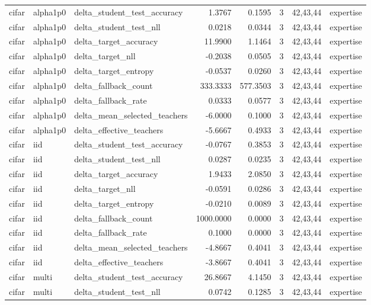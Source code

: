 \begin{tabular}{lllrrrll}
cifar & alpha1p0 & delta\_student\_test\_accuracy & 1.3767 & 0.1595 & 3 & 42,43,44 & expertise \\
cifar & alpha1p0 & delta\_student\_test\_nll & 0.0218 & 0.0344 & 3 & 42,43,44 & expertise \\
cifar & alpha1p0 & delta\_target\_accuracy & 11.9900 & 1.1464 & 3 & 42,43,44 & expertise \\
cifar & alpha1p0 & delta\_target\_nll & -0.2038 & 0.0505 & 3 & 42,43,44 & expertise \\
cifar & alpha1p0 & delta\_target\_entropy & -0.0537 & 0.0260 & 3 & 42,43,44 & expertise \\
cifar & alpha1p0 & delta\_fallback\_count & 333.3333 & 577.3503 & 3 & 42,43,44 & expertise \\
cifar & alpha1p0 & delta\_fallback\_rate & 0.0333 & 0.0577 & 3 & 42,43,44 & expertise \\
cifar & alpha1p0 & delta\_mean\_selected\_teachers & -6.0000 & 0.1000 & 3 & 42,43,44 & expertise \\
cifar & alpha1p0 & delta\_effective\_teachers & -5.6667 & 0.4933 & 3 & 42,43,44 & expertise \\
cifar & iid & delta\_student\_test\_accuracy & -0.0767 & 0.3853 & 3 & 42,43,44 & expertise \\
cifar & iid & delta\_student\_test\_nll & 0.0287 & 0.0235 & 3 & 42,43,44 & expertise \\
cifar & iid & delta\_target\_accuracy & 1.9433 & 2.0850 & 3 & 42,43,44 & expertise \\
cifar & iid & delta\_target\_nll & -0.0591 & 0.0286 & 3 & 42,43,44 & expertise \\
cifar & iid & delta\_target\_entropy & -0.0210 & 0.0089 & 3 & 42,43,44 & expertise \\
cifar & iid & delta\_fallback\_count & 1000.0000 & 0.0000 & 3 & 42,43,44 & expertise \\
cifar & iid & delta\_fallback\_rate & 0.1000 & 0.0000 & 3 & 42,43,44 & expertise \\
cifar & iid & delta\_mean\_selected\_teachers & -4.8667 & 0.4041 & 3 & 42,43,44 & expertise \\
cifar & iid & delta\_effective\_teachers & -3.8667 & 0.4041 & 3 & 42,43,44 & expertise \\
cifar & multi & delta\_student\_test\_accuracy & 26.8667 & 4.1450 & 3 & 42,43,44 & expertise \\
cifar & multi & delta\_student\_test\_nll & 0.0742 & 0.1285 & 3 & 42,43,44 & expertise \\

\end{tabular}
